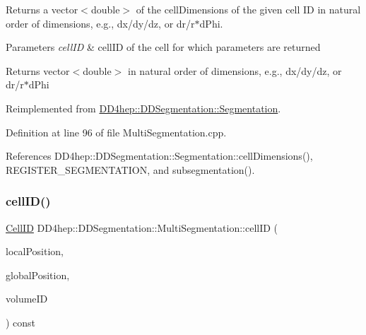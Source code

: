 Returns a vector$<$double$>$ of the cell\+Dimensions of the given cell ID in natural order of dimensions, e.\+g., dx/dy/dz, or dr/r$\ast$d\+Phi. 


\begin{DoxyParams}{Parameters}
{\em cell\+ID} & cell\+ID of the cell for which parameters are returned \\
\hline
\end{DoxyParams}
\begin{DoxyReturn}{Returns}
vector$<$double$>$ in natural order of dimensions, e.\+g., dx/dy/dz, or dr/r$\ast$d\+Phi 
\end{DoxyReturn}


Reimplemented from \hyperlink{class_d_d4hep_1_1_d_d_segmentation_1_1_segmentation_ac2119ba64c9805751e08b6100ef6fee6}{D\+D4hep\+::\+D\+D\+Segmentation\+::\+Segmentation}.



Definition at line 96 of file Multi\+Segmentation.\+cpp.



References D\+D4hep\+::\+D\+D\+Segmentation\+::\+Segmentation\+::cell\+Dimensions(), R\+E\+G\+I\+S\+T\+E\+R\+\_\+\+S\+E\+G\+M\+E\+N\+T\+A\+T\+I\+ON, and subsegmentation().

\hypertarget{class_d_d4hep_1_1_d_d_segmentation_1_1_multi_segmentation_a3e054169c43049547cdd67e4f2f60105}{}\label{class_d_d4hep_1_1_d_d_segmentation_1_1_multi_segmentation_a3e054169c43049547cdd67e4f2f60105} 
\subsubsection{\texorpdfstring{cell\+I\+D()}{cellID()}}
{\footnotesize\ttfamily \hyperlink{namespace_d_d4hep_1_1_d_d_segmentation_ac7af071d85cb48820914434a07e21ba1}{Cell\+ID} D\+D4hep\+::\+D\+D\+Segmentation\+::\+Multi\+Segmentation\+::cell\+ID (\begin{DoxyParamCaption}\item[{const \hyperlink{struct_d_d4hep_1_1_d_d_segmentation_1_1_vector3_d}{Vector3D} \&}]{local\+Position,  }\item[{const \hyperlink{struct_d_d4hep_1_1_d_d_segmentation_1_1_vector3_d}{Vector3D} \&}]{global\+Position,  }\item[{const \hyperlink{namespace_d_d4hep_1_1_d_d_segmentation_a61a6833a18d1800bdef176595f83e3ba}{Volume\+ID} \&}]{volume\+ID }\end{DoxyParamCaption}) const\hspace{0.3cm}{\ttfamily [virtual]}}



